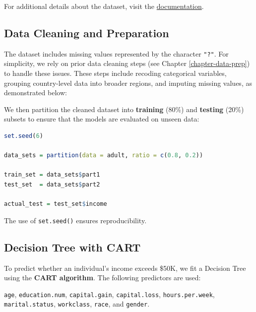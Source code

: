 \documentclass[
]{book}
\newcommand{\passthrough}[1]{#1}
\theoremstyle{definition}
\theoremstyle{definition}
\theoremstyle{definition}
\theoremstyle{definition}
\theoremstyle{remark}
\begin{document}
For additional details about the dataset, visit the \href{https://www.rdocumentation.org/packages/liver/versions/1.3/topics/adult}{documentation}.

\subsection*{Data Cleaning and Preparation}\label{data-cleaning-and-preparation}

The dataset includes missing values represented by the character \passthrough{\lstinline!"?"!}. For simplicity, we rely on prior data cleaning steps (see Chapter \ref{chapter-data-prep}) to handle these issues. These steps include recoding categorical variables, grouping country-level data into broader regions, and imputing missing values, as demonstrated below:

We then partition the cleaned dataset into \textbf{training} (80\%) and \textbf{testing} (20\%) subsets to ensure that the models are evaluated on unseen data:

\begin{lstlisting}[language=R]
set.seed(6)

data_sets = partition(data = adult, ratio = c(0.8, 0.2))

train_set = data_sets$part1
test_set  = data_sets$part2

actual_test = test_set$income
\end{lstlisting}

The use of \passthrough{\lstinline!set.seed()!} ensures reproducibility.

\subsection*{Decision Tree with CART}\label{decision-tree-with-cart}

To predict whether an individual's income exceeds \$50K, we fit a Decision Tree using the \textbf{CART algorithm}. The following predictors are used:

\passthrough{\lstinline!age!}, \passthrough{\lstinline!education.num!}, \passthrough{\lstinline!capital.gain!}, \passthrough{\lstinline!capital.loss!}, \passthrough{\lstinline!hours.per.week!}, \passthrough{\lstinline!marital.status!}, \passthrough{\lstinline!workclass!}, \passthrough{\lstinline!race!}, and \passthrough{\lstinline!gender!}.
\end{document}

